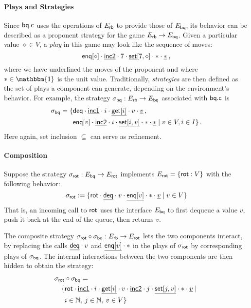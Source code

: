 \documentclass[sigplan,10pt,authordraft]{acmart}
\begin{document}
\paragraph{Plays and Strategies}

Since $ \mathsf{bq.c} $
uses the operations of $E_{ \mathsf{rb} }$ to
provide those of $E_{ \mathsf{bq} }$,
its behavior
can be described as a proponent strategy for the game
$E_{ \mathsf{rb} } \rightarrow E_{ \mathsf{bq} }$.
Given a particular value $\diamond \in V$,
a \emph{play} in this game may look like the sequence of moves:
\[
   \mathsf{enq} [\diamond] \cdot
  \underline{ \mathsf{inc2} } \cdot
  7 \cdot
  \underline{ \mathsf{set} }[7, \diamond] \cdot
  * \cdot
  \underline*
  \:,
\]
where we have underlined the moves of the proponent
and where $* \in \mathbbm{1}$ is the unit value.
Traditionally,
\emph{strategies} are then defined as
the set of plays a component can generate,
depending on the environment's behavior.
For example,
the strategy
$\sigma_{ \mathsf{bq} } : E_{ \mathsf{rb} } \rightarrow E_{ \mathsf{bq} }$
associated with $ \mathsf{bq.c} $ is
\begin{align*}
  \sigma_{ \mathsf{bq} } =
  \{ 
   & \mathsf{deq}  \cdot
    \underline{ \mathsf{inc1} } \cdot
    i \cdot
    \underline{ \mathsf{get} [i]} \cdot
    v \cdot
    \underline{v} \,, \\
   & \mathsf{enq} [v] \cdot
    \underline{ \mathsf{inc2} } \cdot
    i \cdot
    \underline{ \mathsf{set} [i, v]} \cdot
    * \cdot
    \underline*
  \mid
    v \in V, i \in I
  \}
  \,.
\end{align*}
Here again,
set inclusion $\subseteq$
can serve as refinement.

\paragraph{Composition}

Suppose the strategy
$\sigma_{ \mathsf{rot} } : E_{ \mathsf{bq} } \rightarrow E_{ \mathsf{rot} }$
implements %
$E_{ \mathsf{rot} } = \{  \mathsf{rot}  : V \}$
with the following behavior:
\[
  \sigma_{ \mathsf{rot} } := \{
     \mathsf{rot}  \cdot
    \underline{ \mathsf{deq} } \cdot
    v \cdot
    \underline{ \mathsf{enq} [v]} \cdot
    * \cdot
    \underline{v}
    \mid v \in V
  \}
\]
That is,
an incoming call to $ \mathsf{rot} $
uses the interface $E_{ \mathsf{bq} }$
to first dequeue a value $v$,
push it back at the end of the queue,
then returns $v$.

The composite strategy
$\sigma_{ \mathsf{rot} } \circ \sigma_{ \mathsf{bq} } :
 E_{ \mathsf{rb} } \rightarrow E_{ \mathsf{rot} }$
lets the two components interact,
by replacing the calls
$\underline{ \mathsf{deq} } \cdot v$
and
$\underline{ \mathsf{enq} [v]} \cdot *$
in the plays of $\sigma_{ \mathsf{rot} }$
by corresponding plays of $\sigma_{ \mathsf{bq} }$.
The internal interactions between the two components
are then hidden to obtain the strategy:
\begin{align*}
  \sigma_{ \mathsf{rot} } &\circ \sigma_{ \mathsf{bq} } = \\
  \{
   & \mathsf{rot}  \cdot
    \underline{ \mathsf{inc1} } \cdot i \cdot
    \underline{ \mathsf{get} [i]} \cdot v \cdot
    \underline{ \mathsf{inc2} } \cdot j \cdot
    \underline{ \mathsf{set} [j,v]} \cdot * \cdot
    \underline{v}
  \mid {} \\
   &i \in \mathbb{N}, \:
    j \in \mathbb{N}, \:
    v \in V
  \}
\end{align*}
\end{document}
